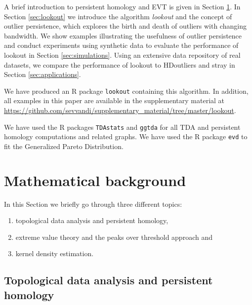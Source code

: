 \documentclass[11pt,a4paper,]{article}
\providecommand{\tightlist}{%
  \setlength{\itemsep}{0pt}\setlength{\parskip}{0pt}}
\theoremstyle{definition}
\theoremstyle{definition}
\theoremstyle{definition}
\theoremstyle{remark}
\begin{document}
A brief introduction to persistent homology and EVT is given in Section \ref{sec:methodology}. In Section \ref{sec:lookout} we introduce the algorithm \emph{lookout} and the concept of outlier persistence, which explores the birth and death of outliers with changing bandwidth. We show examples illustrating the usefulness of outlier persistence and conduct experiments using synthetic data to evaluate the performance of lookout in Section \ref{sec:simulations}. Using an extensive data repository of real datasets, we compare the performance of lookout to HDoutliers and stray in Section \ref{sec:applications}.

We have produced an R package \texttt{lookout} \autocite{lookoutR} containing this algorithm. In addition, all examples in this paper are available in the supplementary material at \url{https://github.com/sevvandi/supplementary_material/tree/master/lookout}.

We have used the R packages \texttt{TDAstats} \autocite{tdastatsR} and \texttt{ggtda} \autocite{ggdta} for all TDA and persistent homology computations and related graphs. We have used the R package \texttt{evd} \autocite{evdR} to fit the Generalized Pareto Distribution.

\hypertarget{sec:methodology}{%
\section{Mathematical background}\label{sec:methodology}}

In this Section we briefly go through three different topics:

\begin{enumerate}
\def\labelenumi{\arabic{enumi}.}
\tightlist
\item
  topological data analysis and persistent homology,
\item
  extreme value theory and the peaks over threshold approach and
\item
  kernel density estimation.
\end{enumerate}

\hypertarget{subsec:tda}{%
\subsection{Topological data analysis and persistent homology}\label{subsec:tda}}
\end{document}
